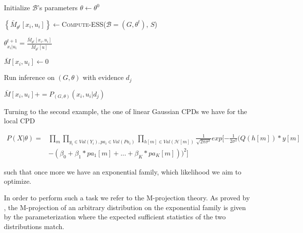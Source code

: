 \documentclass[11pt]{article}
\begin{document}
\begin{article}
\begin{algorithm*}[h!]
\begin{multicols}{2}
\begin{algorithmic}[1]
\State Initialize $\mathcal{B}$'s parameters $\theta \leftarrow \theta^0$

  \State $\left\{ \bar{M}_{\theta^t}[x_{i},u_{i}]\right\} \leftarrow$\textsc{Compute-ESS}($\mathcal{B}=(G,\theta^{t})$, $S$)



      \State $\theta_{x_{i}|u_{i}}^{t+1}=\frac{\bar{M}_{\theta^{t}}[x_{i},u_{i}]}{\bar{M}_{\theta^{t}}[u]}$
    \EndFor
  \EndFor
\EndFor
\EndProcedure
\\

   \State $\bar{M}[x_{i},u_{i}]\leftarrow 0$
  \EndFor
\EndFor

    \State Run inference on $(G,\theta)$ with evidence $d_{j}$

        \State $\bar{M}[x_{i},u_{i}] \mathrel{{+}{=}} P_{(G,\theta)}(x_{i},u_{i}|d_{j})$
      \EndFor
    \EndFor
\EndFor
\EndFunction
\end{algorithmic}
\end{multicols}
\end{algorithm*}


Turning to the second example, the one of linear Gaussian CPDs we
have for the local CPD

\begin{align} \label{eq:like-gaussian-cpd}
P(X|\theta) = &\prod_m \prod_{y_i \in Val(Y_i), pa_i \in Val(Pa_i)} \prod_{h[m] \in Val(\mathscr{H}[m])} \frac{1}{\sqrt{2\pi\sigma^2}} exp[-\frac{1}{2\sigma^2} (Q(h[m]) * y[m]  \\
	    & - (\beta_0 + \beta_1 * pa_1[m] + ... + \beta_K * pa_K[m]))^2]  \nonumber
\end{align}

such that once more we have an exponential family, which likelihood
we aim to optimize.

In order to perform such a task we refer to the M-projection
theory. As proved by \cite{koller2009probabilistic}, the M-projection
of an arbitrary distribution on the exponential family is given by the
parameterization where the expected sufficient statistics of the
two distributions match.


\end{article}
\end{document}
